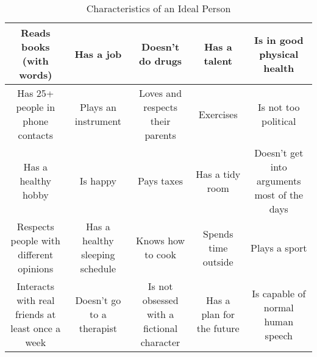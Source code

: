\documentclass{article}
\begin{document}
\begin{table}
    \centering
    \caption*{Characteristics of an Ideal Person}
    \begin{tabular}{|*{5}{C}}
        \hline
        Reads books (with words) & Has a job & Doesn't do drugs & Has a talent & Is in good physical health \\
        \hline
        Has 25+ people in phone contacts & Plays an instrument & Loves and respects their parents & Exercises & Is not too political \\
        \hline
        Has a healthy hobby & Is happy & Pays taxes & Has a tidy room & Doesn't get into arguments most of the days \\
        \hline
        Respects people with different opinions & Has a healthy sleeping schedule & Knows how to cook & Spends time outside & Plays \newline a sport \\
        \hline
        Interacts with real friends at least once a week & Doesn't go to a therapist & Is not obsessed with a fictional character & Has a plan for the future & Is capable of normal human speech \\
        \hline
    \end{tabular}
\end{table}
\end{document}
